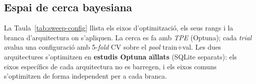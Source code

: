 \documentclass[10pt,a4paper,twocolumn,twoside]{article}
\begin{document}
%
%
%
%
%
%
\newpage

\subsection{Espai de cerca bayesiana}
\label{app:sweep-config}

La Taula~\ref{tab:sweep-config} llista els eixos d'optimització, els seus rangs i la branca
d'arquitectura on s'apliquen. La cerca es fa amb \textit{TPE} (Optuna); cada \textit{trial} avalua
una configuració amb 5-\textit{fold} CV sobre el \textit{pool} train+val. Les dues arquitectures
s'optimitzen en \textbf{estudis Optuna aïllats} (SQLite separats): els eixos específics de cada
arquitectura no es barregen, i els eixos comuns s'optimitzen de forma independent per a cada branca.
\end{document}
